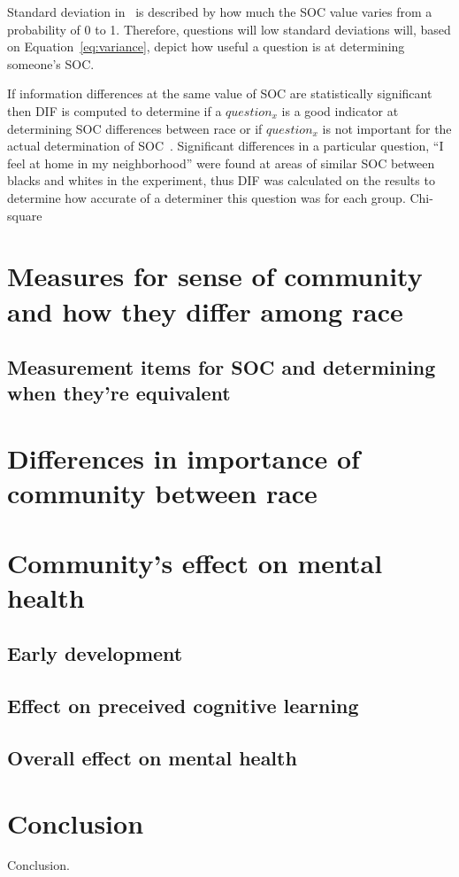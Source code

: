 \documentclass{sig-alternate}
\begin{document}
Standard deviation in~\cite{disparities:2009} is described by how much the SOC value varies from a probability of 0 to 1. Therefore, questions will low standard deviations will, based on Equation~\ref{eq:variance}, depict how useful a question is at determining someone's SOC. 

If information differences at the same value of SOC are statistically significant then DIF is computed to determine if a $question_x$ is a good indicator at determining SOC differences between race or if $question_x$ is not important for the actual determination of SOC~\cite{disparities:2009}.
Significant differences in a particular question, ``I feel at home in my neighborhood'' were found at areas of similar SOC between blacks and whites in the experiment, thus DIF was calculated on the results to determine how accurate of a determiner this question was for each group. Chi-square 

\section{Measures for sense of community and how they differ among race}


\subsection{Measurement items for SOC and determining when they're equivalent}

\section{Differences in importance of community between race}


\section{Community's effect on mental health}
\subsection{Early development}
\subsection{Effect on preceived cognitive learning}
\subsection{Overall effect on mental health}



\section{Conclusion}
Conclusion.

\nocite{*}



\end{document}
